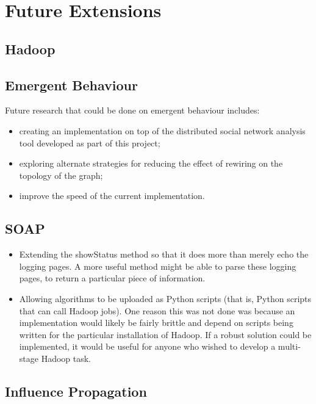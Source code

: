 \section{Future Extensions}


\subsection{Hadoop}

\subsection{Emergent Behaviour}

Future research that could be done on emergent behaviour includes:

\begin{itemize}
	\item creating an implementation on top of the distributed social network analysis tool developed as part of this project;
	\item exploring alternate strategies for reducing the effect of rewiring on the topology of the graph;
	\item improve the speed of the current implementation.
\end{itemize}

\subsection{SOAP}

\begin{itemize}
	\item Extending the showStatus method so that it does more than merely echo the logging pages. A more useful method might be able to parse these logging pages, to return a particular piece of information.
	\item Allowing algorithms to be uploaded as Python scripts (that is, Python scripts that can call Hadoop jobs). One reason this was not done was because an implementation would likely be fairly brittle and depend on scripts being written for the particular installation of Hadoop. If a robust solution could be implemented, it would be useful for anyone who wished to develop a multi-stage Hadoop task. 
\end{itemize}

\subsection{Influence Propagation}

